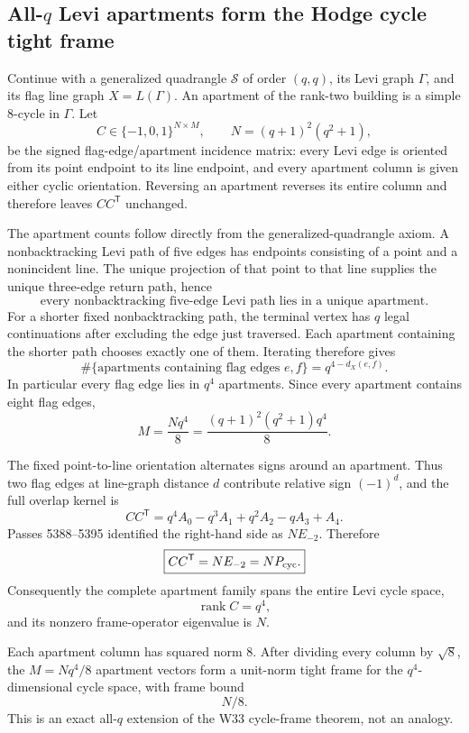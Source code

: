 \subsection{All-\(q\) Levi apartments form the Hodge cycle tight frame}

Continue with a generalized quadrangle \(\mathcal S\) of order \((q,q)\), its Levi graph
\(\Gamma\), and its flag line graph \(X=L(\Gamma)\).  An apartment of the rank-two
building is a simple \(8\)-cycle in \(\Gamma\).  Let
\[
C\in\{-1,0,1\}^{N\times M},
\qquad
N=(q+1)^2(q^2+1),
\]
be the signed flag-edge/apartment incidence matrix: every Levi edge is oriented from its
point endpoint to its line endpoint, and every apartment column is given either cyclic
orientation.  Reversing an apartment reverses its entire column and therefore leaves
\(CC^{\mathsf T}\) unchanged.

The apartment counts follow directly from the generalized-quadrangle axiom.  A
nonbacktracking Levi path of five edges has endpoints consisting of a point and a
nonincident line.  The unique projection of that point to that line supplies the unique
three-edge return path, hence
\[
\boxed{\text{every nonbacktracking five-edge Levi path lies in a unique apartment}.}
\]
For a shorter fixed nonbacktracking path, the terminal vertex has \(q\) legal continuations
after excluding the edge just traversed.  Each apartment containing the shorter path chooses
exactly one of them.  Iterating therefore gives
\[
\boxed{
\#\{\text{apartments containing flag edges }e,f\}=q^{4-d_X(e,f)}.
}
\]
In particular every flag edge lies in \(q^4\) apartments.  Since every apartment contains
eight flag edges,
\[
\boxed{
M=\frac{Nq^4}{8}
=\frac{(q+1)^2(q^2+1)q^4}{8}.
}
\]

The fixed point-to-line orientation alternates signs around an apartment.  Thus two flag
edges at line-graph distance \(d\) contribute relative sign \((-1)^d\), and the full overlap
kernel is
\[
\boxed{
CC^{\mathsf T}
=q^4A_0-q^3A_1+q^2A_2-qA_3+A_4.
}
\]
Passes 5388--5395 identified the right-hand side as \(N E_{-2}\).  Therefore
\[
\boxed{
CC^{\mathsf T}=N E_{-2}=N P_{\rm cyc}.
}
\]
Consequently the complete apartment family spans the entire Levi cycle space,
\[
\boxed{\operatorname{rank}C=q^4,}
\]
and its nonzero frame-operator eigenvalue is \(N\).

Each apartment column has squared norm \(8\).  After dividing every column by \(\sqrt8\),
the \(M=Nq^4/8\) apartment vectors form a unit-norm tight frame for the
\(q^4\)-dimensional cycle space, with frame bound
\[
\boxed{N/8.}
\]
This is an exact all-\(q\) extension of the W33 cycle-frame theorem, not an analogy.

